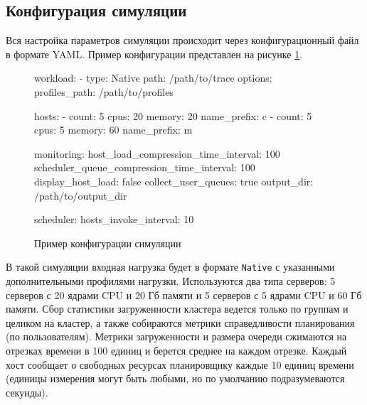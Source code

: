 \subsection{Конфигурация симуляции}

Вся настройка параметров симуляции происходит через конфигурационный файл в формате YAML. Пример конфигурации представлен на рисунке \ref{fig:example-sim-config}. 

\begin{figure}[h!]
    \footnotesize
    \begin{yamlcode}
                    workload:
                      - type: Native
                        path: /path/to/trace
                        options: 
                          profiles_path: /path/to/profiles
                    
                    hosts: 
                      - count: 5
                        cpus: 20
                        memory: 20
                        name_prefix: c
                      - count: 5
                        cpus: 5
                        memory: 60
                        name_prefix: m
                    
                    monitoring:
                      host_load_compression_time_interval: 100
                      scheduler_queue_compression_time_interval: 100
                      display_host_load: false 
                      collect_user_queues: true
                      output_dir: /path/to/output_dir
                    
                    scheduler:
                      hosts_invoke_interval: 10
\end{yamlcode}
\caption{Пример конфигурации симуляции}
\label{fig:example-sim-config}
\end{figure}

В такой симуляции входная нагрузка будет в формате \texttt{Native} с указанными дополнительными профилями нагрузки. Используются два типа серверов: 5 серверов с 20 ядрами CPU и 20 Гб памяти и 5 серверов с 5 ядрами CPU и 60 Гб памяти. Сбор статистики загруженности кластера ведется только по группам и целиком на кластер, а также собираются метрики справедливости планирования (по пользователям). Метрики загруженности и размера очереди сжимаются на отрезках времени в 100 единиц и берется среднее на каждом отрезке. Каждый хост сообщает о свободных ресурсах планировщику каждые 10 единиц времени (единицы измерения могут быть любыми, но по умолчанию подразумеваются секунды). 

